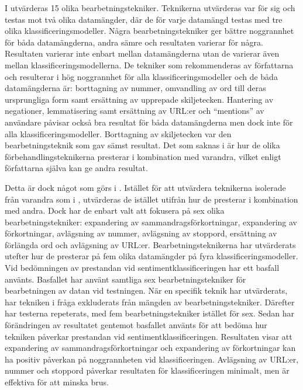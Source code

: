 \documentclass{kaumasters} %
\begin{document}
I \cite{effrosynidis2017comparison} utvärderas 15 olika bearbetningstekniker. Teknikerna utvärderas var för sig och testas mot två olika datamängder, där de för varje datamängd testas med tre olika klassificeringsmodeller.  Några bearbetningstekniker ger bättre noggrannhet för båda datamängderna, andra sämre och resultaten varierar för några. Resultaten varierar inte enbart mellan datamängderna utan de varierar även mellan klassificeringsmodellerna. De tekniker som rekommenderas av författarna och resulterar i hög noggrannhet för alla klassificeringsmodeller och de båda datamängderna är: borttagning av nummer, omvandling av ord till deras ursprungliga form samt ersättning av upprepade skiljetecken. Hantering av negationer, lemmatisering samt ersättning av URL:er och “mentions” av användare påvisar också bra resultat för båda datamängderna men dock inte för alla klassificeringsmodeller. Borttagning av skiljetecken var den bearbetningsteknik som gav sämst resultat. Det som saknas i \cite{effrosynidis2017comparison} är hur de olika förbehandlingsteknikerna presterar i kombination med varandra, vilket enligt författarna själva kan ge andra resultat.

Detta är dock något som görs i \cite{7862202}. Istället för att utvärdera teknikerna isolerade från varandra som i \cite{effrosynidis2017comparison}, utvärderas de istället utifrån hur de presterar i kombination med andra. Dock har de enbart valt att fokusera på sex olika bearbetningstekniker: expandering av sammandragsförkortningar, expandering av förkortningar, avlägsning av nummer, avlägsning av stoppord, ersättning av förlängda ord och avlägsning av URL:er. Bearbetningsteknikerna har utvärderats utefter hur de presterar på fem olika datamängder på fyra klassificeringsmodeller. Vid bedömningen av prestandan vid sentimentklassificeringen har ett basfall använts. Basfallet har använt samtliga sex bearbetningstekniker för bearbetningen av datan vid testningen. När en specifik teknik har utvärderats, har tekniken i fråga exkluderats från mängden av bearbetningstekniker. Därefter har testerna repeterats, med fem bearbetningstekniker istället för sex. Sedan har förändringen av resultatet gentemot basfallet använts för att bedöma hur tekniken påverkar prestandan vid sentimentklassificeringen. Resultaten visar att expandering av sammandragsförkortningar och expandering av förkortningar kan ha positiv påverkan på noggrannheten vid klassificeringen. Avlägsning av URL:er, nummer och stoppord påverkar resultaten för klassificeringen minimalt, men är effektiva för att minska brus. 
\end{document}
